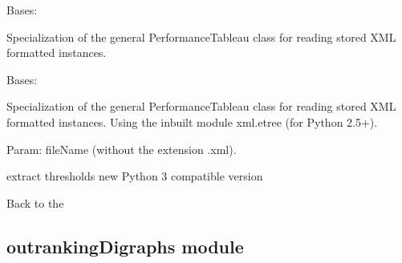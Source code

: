 \documentclass[letterpaper,10pt,english]{sphinxmanual}
\begin{document}

\begin{fulllineitems}
\label{techDoc:perfTabs.XMLPerformanceTableau}
Bases: {\hyperref[techDoc:perfTabs.PerformanceTableau]{\emph{}}}

Specialization of the general PerformanceTableau class for reading
stored XML formatted instances.

\end{fulllineitems}


\begin{fulllineitems}
\label{techDoc:perfTabs.XMLRubisPerformanceTableau}
Bases: {\hyperref[techDoc:perfTabs.PerformanceTableau]{\emph{}}}

Specialization of the general PerformanceTableau class for reading
stored XML formatted instances. Using the inbuilt module
xml.etree (for Python 2.5+).

Param: fileName (without the extension .xml).

\begin{fulllineitems}
\label{techDoc:perfTabs.XMLRubisPerformanceTableau.stripsplit}
extract thresholds new Python 3 compatible version

\end{fulllineitems}


\end{fulllineitems}


Back to the {\hyperref[techDoc:technical-label]{\emph{}}}


\subsection{outrankingDigraphs module}
\label{techDoc:outrankingdigraphs-label}\label{techDoc:outrankingdigraphs-module}\label{techDoc:module-outrankingDigraphs}
\end{document}
